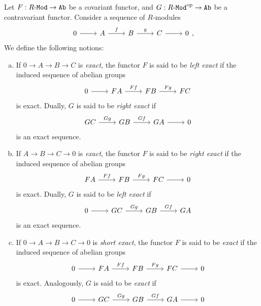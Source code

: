 \begin{definition}
    \label{def:left-exact-functor}
    Let \(F: {R\text{-}\texttt{Mod}} \to {\texttt{Ab}}\) be a covariant functor, and
    \(G: {R\text{-}\texttt{Mod}}^{\mathrm{op}} \to {\texttt{Ab}}\) be a contravariant functor. Consider a sequence of
    \(R\)-modules
    \[
        \begin{tikzcd}
            0 \ar[r] &A \ar[r, "f"] &B \ar[r, "g"] &C \ar[r] &0
        \end{tikzcd},
    \]
    We define the following notions:
    \begin{enumerate}[(a)]\setlength\itemsep{0em}
        \item If \(0 \to A \to B \to C\) is \emph{exact}, the functor \(F\) is said to
              be \emph{left exact} if the induced sequence of abelian groups
              \[
                  \begin{tikzcd}
                      0 \ar[r] &F A \ar[r, "F f"] &F B \ar[r, "F g"] &F C
                  \end{tikzcd}
              \]
              is exact. Dually, \(G\) is said to be \emph{right exact} if
              \[
                  \begin{tikzcd}
                      G C \ar[r, "G g"] &G B \ar[r, "G f"] &G A \ar[r] &0
                  \end{tikzcd}
              \]
              is an exact sequence.
        \item If \(A \to B \to C \to 0\) is \emph{exact}, the functor \(F\) is said to
              be \emph{right exact} if the induced sequence of abelian groups
              \[
                  \begin{tikzcd}
                      F A \ar[r, "F f"] &F B \ar[r, "F g"] &F C \ar[r] &0
                  \end{tikzcd}
              \]
              is exact. Dually, \(G\) is said to be \emph{left exact} if
              \[
                  \begin{tikzcd}
                      0 \ar[r] &G C \ar[r, "G g"] &G B \ar[r, "G f"] &G A
                  \end{tikzcd}
              \]
              is an exact sequence.
        \item If \(0 \to A \to B \to C \to 0\) is \emph{short exact}, the functor \(F\)
              is said to be \emph{exact} if the induced sequence of abelian groups
              \[
                  \begin{tikzcd}
                      0 \ar[r] &F A \ar[r, "F f"] &F B \ar[r, "F g"] &F C \ar[r] &0
                  \end{tikzcd}
              \]
              is exact. Analogously, \(G\) is said to be \emph{exact} if
              \[
                  \begin{tikzcd}
                      0 \ar[r] &G C \ar[r, "G g"] &G B \ar[r, "G f"] &G A \ar[r] &0
                  \end{tikzcd}
              \]
    \end{enumerate}
\end{definition}

